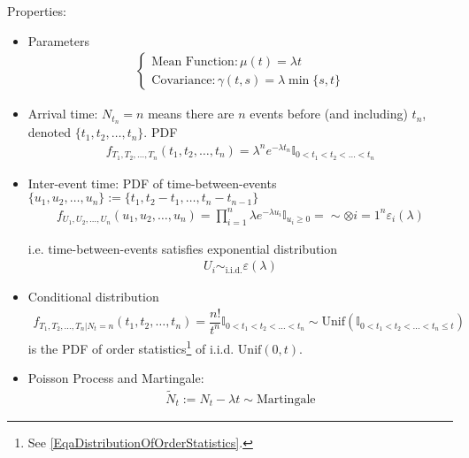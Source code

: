 Properties:
\begin{itemize}[topsep=2pt,itemsep=0pt]
    \item Parameters
    \begin{align}
        \begin{cases}
            \text{Mean Function}:\mu (t)=\lambda t\\
            \text{Covariance}:\gamma (t,s)=\lambda \min\{s,t\} 
        \end{cases}
    \end{align}
    \item Arrival time: $ N_{t_n}=n $ means there are $ n $ events before (and including) $ t_n $, denoted $ \{t_1,t_2,\ldots,t_n\} $. PDF
    \begin{align}
        f_{T_1,T_2,\ldots,T_n}(t_1,t_2,\ldots,t_n)=\lambda ^ne^{-\lambda t_n}\mathbb{I}_{0<t_1<t_2<\ldots<t_n}
    \end{align}
    \item Inter-event time: PDF of time-between-events $ \{u_1,u_2,\ldots,u_n\}:=\{t_1,t_2-t_1,\ldots,t_n-t_{n-1}\} $
    \begin{align}
        f_{U_1,U_2,\ldots,U_n}(u_1,u_2,\ldots,u_n)=\prod_{i=1}^n \lambda e^{-\lambda u_i}\mathbb{I}_{u_i\geq 0}=\sim \otimes{i=1}^n\varepsilon_i (\lambda )
    \end{align}
    
    i.e. time-between-events satisfies exponential distribution
    \begin{align}
        U_i\sim_\mathrm{i.i.d.}  \varepsilon (\lambda ) 
    \end{align}

    \item Conditional distribution
    \begin{align}
        f_{T_1,T_2,\ldots,T_n|N_t=n}(t_1,t_2,\ldots,t_n)=\dfrac{n!}{t^n}\mathbb{I}_{0<t_1<t_2<\ldots<t_n}\sim \mathrm{Unif}\left(\mathbb{I}_{0<t_1<t_2<\ldots<t_n\leq t}\right) 
    \end{align}
    is the PDF of order statistics\footnote{See \autoref{EqaDistributionOfOrderStatistics}.} of i.i.d. $ \mathrm{Unif}(0,t)  $.
    \item Poisson Process and Martingale: 
    \begin{align}
        \tilde{N}_t:=N_t-\lambda t\sim\mathrm{Martingale}  
    \end{align}
    
\end{itemize}



